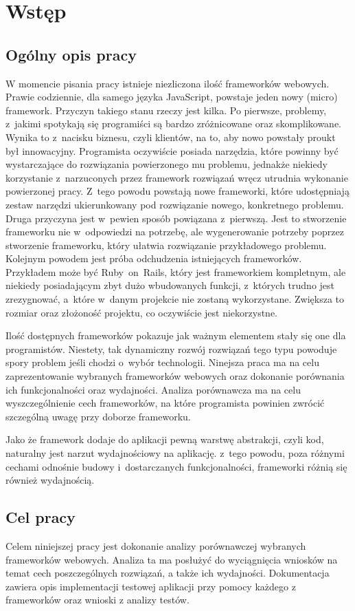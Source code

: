 \chapter{Wstęp}
\section{Ogólny opis pracy}
W momencie pisania pracy istnieje niezliczona ilość frameworków webowych. Prawie codziennie, dla samego języka JavaScript, powstaje jeden nowy (micro) framework. Przyczyn takiego stanu rzeczy jest kilka. Po pierwsze, problemy, z~jakimi spotykają się programiści są bardzo zróżnicowane oraz skomplikowane. Wynika to z~nacisku biznesu, czyli klientów, na to, aby nowo powstały proukt był innowacyjny. Programista oczywiście posiada narzędzia, które powinny być wystarczające do rozwiązania powierzonego mu problemu, jednakże niekiedy korzystanie z~narzuconych przez framework rozwiązań wręcz utrudnia wykonanie powierzonej pracy. Z~tego powodu powstają nowe frameworki, które udostępniają zestaw narzędzi ukierunkowany pod rozwiązanie nowego, konkretnego problemu. Druga przyczyna jest w~pewien sposób powiązana z~pierwszą. Jest to stworzenie frameworku nie w~odpowiedzi na potrzebę, ale wygenerowanie potrzeby poprzez stworzenie frameworku, który ułatwia rozwiązanie przykładowego problemu. Kolejnym powodem jest próba odchudzenia istniejących frameworków. Przykładem może być Ruby~on~Rails, który jest frameworkiem kompletnym, ale niekiedy posiadającym zbyt dużo wbudowanych funkcji, z~których trudno jest zrezygnować, a~które w~danym projekcie nie zostaną wykorzystane. Zwiększa to rozmiar oraz złożoność projektu, co oczywiście jest niekorzystne.

Ilość dostępnych frameworków pokazuje jak ważnym elementem stały się one dla programistów. Niestety, tak dynamiczny rozwój rozwiązań tego typu powoduje spory problem jeśli chodzi o~wybór technologii. Ninejsza praca ma na celu zaprezentowanie wybranych frameworków webowych oraz dokonanie porównania ich funkcjonalności oraz wydajności. Analiza porównawcza ma na celu wyszczególnienie cech frameworków, na które programista powinien zwrócić szczególną uwagę przy doborze frameworku.

Jako że framework dodaje do aplikacji pewną warstwę abstrakcji, czyli kod, naturalny jest narzut wydajnościowy na aplikację. z~tego powodu, poza różnymi cechami odnośnie budowy i~dostarczanych funkcjonalności, frameworki różnią się również wydajnością.

\section{Cel pracy}
Celem niniejszej pracy jest dokonanie analizy porównawczej wybranych frameworków webowych. Analiza ta ma posłużyć do wyciągnięcia wniosków na temat cech poszczególnych rozwiązań, a także ich wydajności. Dokumentacja zawiera opis implementacji testowej aplikacji przy pomocy każdego z frameworków oraz wnioski z analizy testów.

